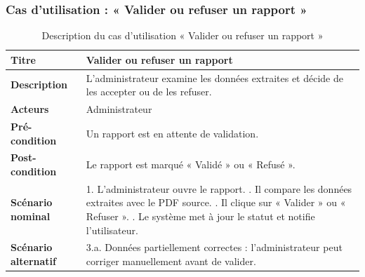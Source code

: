 \subsubsection{Cas d'utilisation : « Valider ou refuser un rapport »}
\begin{table}[h!]
\centering
\renewcommand{\arraystretch}{1.3}
\begin{tabularx}{\textwidth}{|l|X|}
\hline
\textbf{Titre} & Valider ou refuser un rapport \\ \hline
\textbf{Description} & L'administrateur examine les données extraites et décide de
les accepter ou de les refuser. \\ \hline
\textbf{Acteurs} & Administrateur \\ \hline
\textbf{Pré-condition} & Un rapport est en attente de validation. \\ \hline
\textbf{Post-condition} & Le rapport est marqué « Validé » ou « Refusé ». \\ \hline
\textbf{Scénario nominal} &
1. L'administrateur ouvre le rapport. \newline
2. Il compare les données extraites avec le PDF source. \newline
3. Il clique sur « Valider » ou « Refuser ». \newline
4. Le système met à jour le statut et notifie l'utilisateur. \\ \hline
\textbf{Scénario alternatif} &
3.a. Données partiellement correctes : l'administrateur peut corriger manuellement
avant de valider. \\ \hline
\end{tabularx}
\caption{Description du cas d'utilisation « Valider ou refuser un rapport »}
\end{table}

